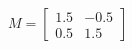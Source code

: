\documentclass[preview]{standalone}
\begin{document}
\begin{align*}
M = \begin{bmatrix} 1.5 & -0.5 \\ 0.5 & 1.5 \end{bmatrix}
\end{align*}
\end{document}

